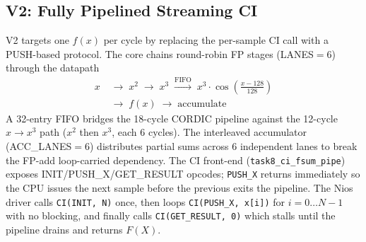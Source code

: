 \documentclass[a4paper,10pt,twocolumn]{article}
\begin{document}
\subsection{V2: Fully Pipelined Streaming CI}
V2 targets one $f(x)$ per cycle by replacing the per-sample CI call with a PUSH-based protocol. The core chains round-robin FP stages (LANES$=6$) through the datapath
\begin{align*}
x &\;\to\; x^2 \;\to\; x^3 \;\xrightarrow{\text{FIFO}}\; x^3{\cdot}\cos\!\left(\tfrac{x-128}{128}\right) \\
 &\;\to\; f(x) \;\to\; \text{accumulate}
\end{align*}
A 32-entry FIFO bridges the 18-cycle CORDIC pipeline against the 12-cycle $x{\to}x^3$ path ($x^2$ then $x^3$, each 6 cycles). The interleaved accumulator (ACC\_LANES$=6$) distributes partial sums across 6 independent lanes to break the FP-add loop-carried dependency. The CI front-end (\texttt{task8\_ci\_fsum\_pipe}) exposes INIT/PUSH\_X/GET\_RESULT opcodes; \texttt{PUSH\_X} returns immediately so the CPU issues the next sample before the previous exits the pipeline. The Nios driver calls \texttt{CI(INIT,\,N)} once, then loops \texttt{CI(PUSH\_X,\,x[i])} for $i=0\ldots N{-}1$ with no blocking, and finally calls \texttt{CI(GET\_RESULT,\,0)} which stalls until the pipeline drains and returns $F(X)$.
\end{document}
